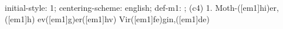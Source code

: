 initial-style: 1;
centering-scheme: english;
def-m1: \grealign;
(c4) 1. Moth-([em1]hi)er,([em1]h) ev([em1]g)er([em1]hv) Vir([em1]fe)gin,([em1]de)